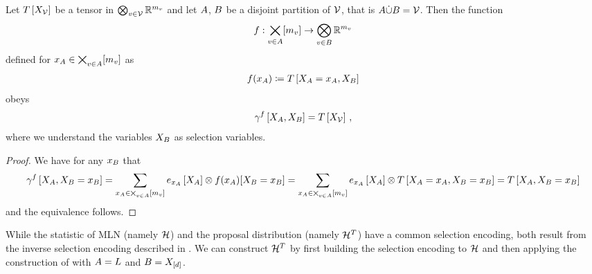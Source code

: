 \begin{theorem}
    \label{the:inverseSelectionEncoding} %
    Let $T\left[X_{\mathcal{V}}\right]$ be a tensor in $\bigotimes_{v\in\mathcal{V}}\mathbb{R}^{m_{v}}$ and let $A$, $B$ be a disjoint partition of $\mathcal{V}$, that is $A\dot{\cup}B=\mathcal{V}$.
    Then the function
    \begin{align*}
        f : \bigtimes_{v\in A}[m_{v}] \rightarrow \bigotimes_{v\in B} \mathbb{R}^{m_{v}}
    \end{align*}
    defined for $x_{A}\in\bigtimes_{v\in A}[m_{v}]$ as
    \begin{align*}
        f(x_{A}) \coloneqq T\left[X_{A}=x_{A},X_{B}\right]
    \end{align*}
    obeys
    \begin{align*}
        \gamma^{f}\left[X_{A},X_{B}\right] = T\left[X_{\mathcal{V}}\right] \, ,
    \end{align*}
    where we understand the variables $X_{B}$ as selection variables.
\end{theorem}
\begin{proof}
    We have for any $x_{B}$ that
    \begin{align*}
        \gamma^{f}\left[X_{A},X_{B}=x_{B}\right]
        = \sum_{x_{A}\in\bigtimes_{v\in A}[m_{v}]} e_{x_{A}}\left[X_{A}\right]
        \otimes f(x_{A})[X_{B}=x_{B}]
        = \sum_{x_{A}\in\bigtimes_{v\in A}[m_{v}]} e_{x_{A}}\left[X_{A}\right]
        \otimes T\left[X_{A}=x_{A},X_{B}=x_{B}\right]
        = T\left[X_{A},X_{B}=x_{B}\right]
    \end{align*}
    and the equivalence follows.
\end{proof}


\begin{example}
    While the statistic of MLN (namely $\mathcal{H}$) and the proposal distribution (namely $\mathcal{H}^T$) have a common selection encoding, both result from the inverse selection encoding described in .
    We can construct $\mathcal{H}^T$ by first building the selection encoding to $\mathcal{H}$ and then applying the construction of  with $A=L$ and $B=X_{[d]}$.
\end{example}


